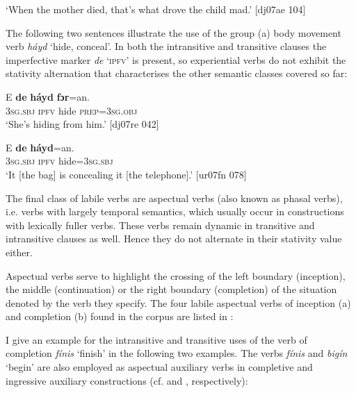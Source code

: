 \glt ‘When the mother died, that’s what drove the child mad.’ [dj07ae 104]
\z

The following two sentences illustrate the use of the group (a) body movement verb \textit{háyd} ‘hide, conceal’. In both the intransitive  and transitive  clauses the imperfective marker \textit{de} ‘\textsc{ipfv}’ is present, so experiential verbs do not exhibit the stativity alternation that characterises the other semantic classes covered so far: 


\ea%
    \label{ex:key:1128}
    \gll E    \textbf{de}  \textbf{háyd}  \textbf{fɔr}=an.\\
\textsc{3sg.sbj}  \textsc{ipfv}  hide    \textsc{prep}=\textsc{3sg.obj}\\

\glt ‘She’s hiding from him.’ [dj07re 042]
\z


\ea%
    \label{ex:key:1129}
    \gll E    \textbf{de}  \textbf{háyd}=an.\\
\textsc{3sg.sbj}  \textsc{ipfv}  hide=\textsc{3sg.sbj}\\

\glt ‘It [the bag] is concealing it [the telephone].’ [ur07fn 078]
\z

The final class of labile verbs are aspectual verbs (also known as phasal verbs), i.e. verbs with largely temporal semantics, which usually occur in constructions with lexically fuller verbs. These verbs remain dynamic in transitive and intransitive clauses as well. Hence they do not alternate in their stativity value either. 


Aspectual verbs serve to highlight the crossing of the left boundary (inception), the middle (continuation) or the right boundary (completion) of the situation denoted by the verb they specify. The four labile aspectual verbs of inception (a) and completion (b) found in the corpus are listed in :

I give an example for the intransitive and transitive uses of the verb of completion \textit{fínis} ‘finish’ in the following two examples. The verbs \textit{fínis} and \textit{bigín} ‘begin’ are also employed as aspectual auxiliary verbs in completive and ingressive auxiliary constructions (cf.  and , respectively):

